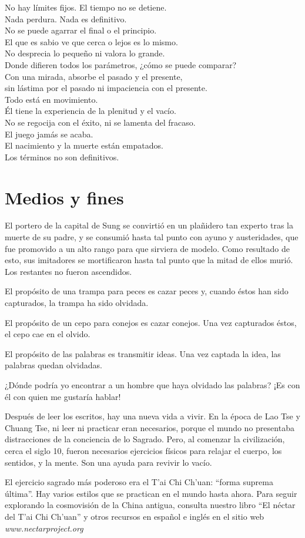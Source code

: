 \documentclass[hidelinks]{memoir}
\begin{document}
	No hay límites fijos. El tiempo no se detiene.\\
	Nada perdura. Nada es definitivo.\\
	No se puede agarrar el final o el principio.\\
	El que es sabio ve que cerca o lejos es lo mismo.\\
	No desprecia lo pequeño ni valora lo grande.\\
	Donde difieren todos los parámetros, ¿cómo se puede comparar?\\
	Con una mirada, absorbe el pasado y el presente,\\
	sin lástima por el pasado ni impaciencia con el presente.\\
	Todo está en movimiento.\\
	Él tiene la experiencia de la plenitud y el vacío.\\
	No se regocija con el éxito, ni se lamenta del fracaso.\\
	El juego jamás se acaba.\\
	El nacimiento y la muerte están empatados.\\
	Los términos no son definitivos.
	
	\chapter*{Medios y fines}
	
	El portero de la capital de Sung se convirtió en un plañidero tan
	experto tras la muerte de su padre, y se consumió hasta tal punto con
	ayuno y austeridades, que fue promovido a un alto rango para que
	sirviera de modelo. Como resultado de esto, sus imitadores se
	mortificaron hasta tal punto que la mitad de ellos murió. Los restantes
	no fueron ascendidos.
	
	El propósito de una trampa para peces es cazar peces y, cuando éstos han
	sido capturados, la trampa ha sido olvidada.
	
	El propósito de un cepo para conejos es cazar conejos. Una vez
	capturados éstos, el cepo cae en el olvido.
	
	El propósito de las palabras es transmitir ideas. Una vez captada la
	idea, las palabras quedan olvidadas.
	
	¿Dónde podría yo encontrar a un hombre que haya olvidado las palabras?
	¡Es con él con quien me gustaría hablar!
	
	Después de leer los escritos, hay una nueva vida a vivir. En la época de
	Lao Tse y Chuang Tse, ni leer ni practicar eran necesarios, porque el
	mundo no presentaba distracciones de la conciencia de lo Sagrado. Pero,
	al comenzar la civilización, cerca el siglo 10, fueron necesarios
	ejercicios físicos para relajar el cuerpo, los sentidos, y la mente. Son
	una ayuda para revivir lo vacío.
	
	El ejercicio sagrado más poderoso era el T'ai Chi Ch'uan: ``forma
	suprema última''. Hay varios estilos que se practican en el mundo hasta
	ahora. Para seguir explorando la cosmovisión de la China antigua,
	consulta nuestro libro ``El néctar del T'ai Chi Ch'uan'' y otros
	recursos en español e inglés en el sitio web
	\textit{www.nectarproject.org}
	
\end{document}
